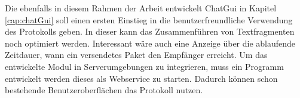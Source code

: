 Die ebenfalls in diesem Rahmen der Arbeit entwickelt ChatGui in Kapitel
\ref{cap:chatGui} soll einen ersten Einstieg in die benutzerfreundliche
Verwendung des Protokolls geben. In dieser kann das Zusammenführen von
Textfragmenten noch optimiert werden. Interessant wäre auch eine Anzeige
über die ablaufende Zeitdauer, wann ein versendetes Paket den Empfänger
erreicht. Um das entwickelte Modul in Serverumgebungen zu integrieren, muss ein
Programm entwickelt werden dieses als Webservice zu starten. Dadurch können
schon bestehende Benutzeroberflächen das Protokoll nutzen.







%
%


